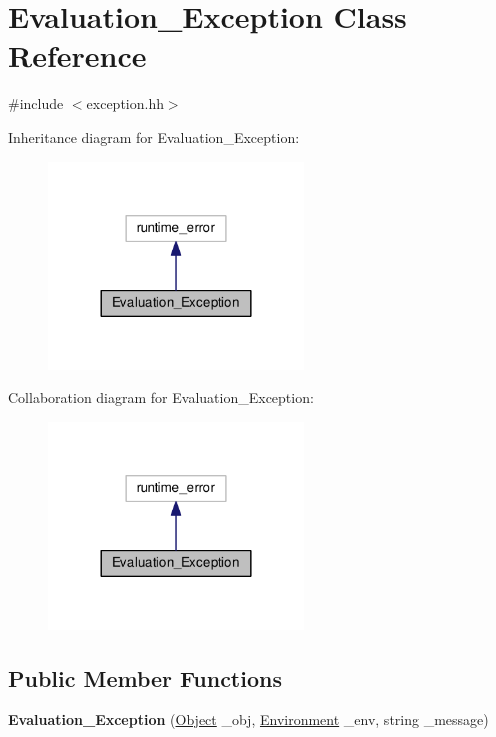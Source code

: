 \hypertarget{classEvaluation__Exception}{\section{Evaluation\-\_\-\-Exception Class Reference}
\label{classEvaluation__Exception}
}


{\ttfamily \#include $<$exception.\-hh$>$}



Inheritance diagram for Evaluation\-\_\-\-Exception\-:\nopagebreak
\begin{figure}[H]
\begin{center}
\leavevmode
\includegraphics[width=192pt]{classEvaluation__Exception__inherit__graph}
\end{center}
\end{figure}


Collaboration diagram for Evaluation\-\_\-\-Exception\-:\nopagebreak
\begin{figure}[H]
\begin{center}
\leavevmode
\includegraphics[width=192pt]{classEvaluation__Exception__coll__graph}
\end{center}
\end{figure}
\subsection*{Public Member Functions}
\begin{DoxyCompactItemize}
\item 
\hypertarget{classEvaluation__Exception_af7d73fddff98cbc5d503b18be20582f9}{{\bfseries Evaluation\-\_\-\-Exception} (\hyperlink{classCell}{Object} \-\_\-obj, \hyperlink{classEnvironment}{Environment} \-\_\-env, string \-\_\-message)}\label{classEvaluation__Exception_af7d73fddff98cbc5d503b18be20582f9}

\end{DoxyCompactItemize}


